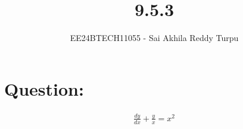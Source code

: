 \documentclass[journal]{IEEEtran}
\begin{document}

\vspace{3cm}

\title{9.5.3}
\author{EE24BTECH11055 - Sai Akhila Reddy Turpu}
{\let\newpage\relax\maketitle}

\renewcommand{\thefigure}{\theenumi}
\renewcommand{\thetable}{\theenumi}
\setlength{\intextsep}{10pt} %


\renewcommand{\thetable}{\theenumi}

\section*{Question:}
\begin{align}
\frac{dy}{dx} + \frac{y}{x} = x^2
\end{align}
\end{document}
